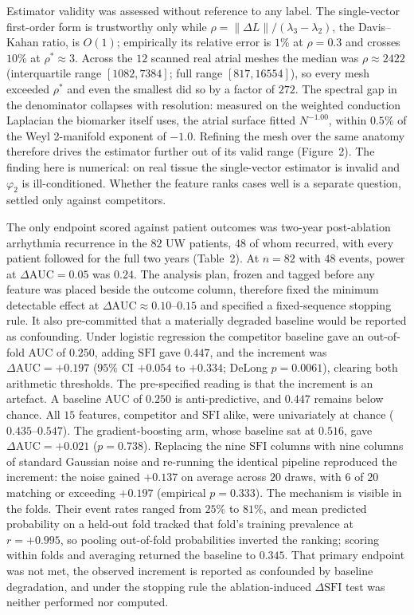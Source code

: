 \documentclass[11pt]{article}
\newcommand{\lam}{\lambda}
\newcommand{\phii}{\varphi}
\newcommand{\rhoval}{\rho}
\newcommand{\SFI}{\ensuremath{\mathrm{SFI}}}
\newcommand{\dAUC}{\ensuremath{\Delta\mathrm{AUC}}}
\begin{document}
Estimator validity was assessed without reference to any label. The
single-vector first-order form is trustworthy only while
$\rhoval=\lVert\Delta L\rVert/(\lam_3-\lam_2)$, the Davis--Kahan ratio\cite{daviskahan1970}, is $O(1)$; empirically its
relative error is $1\%$ at $\rhoval=0.3$ and crosses $10\%$ at
$\rhoval^\ast\approx3$. Across the $12$ scanned real atrial meshes the median was
$\rhoval\approx2422$ (interquartile range $[1082,7384]$; full range
$[817,16554]$), so every mesh exceeded $\rhoval^\ast$ and even the smallest did so
by a factor of $272$. The spectral gap in the denominator collapses with
resolution: measured on the weighted conduction Laplacian the biomarker itself
uses, the atrial surface fitted $N^{-1.00}$, within $0.5\%$ of the Weyl
2-manifold exponent\cite{weyl1912} of $-1.0$. Refining the mesh over the same anatomy therefore
drives the estimator further out of its valid range (Figure~2). The finding here
is numerical: on real tissue the single-vector estimator is invalid and
$\phii_2$ is ill-conditioned. Whether the feature ranks cases well is a separate
question, settled only against competitors.

The only endpoint scored against patient outcomes was two-year post-ablation
arrhythmia recurrence in the $82$ UW patients, $48$ of whom recurred, with every
patient followed for the full two years (Table~2). At $n=82$ with $48$ events,
power at $\dAUC=0.05$ was $0.24$. The analysis plan, frozen and tagged before any
feature was placed beside the outcome column, therefore fixed the minimum
detectable effect at $\dAUC\approx0.10$--$0.15$ and specified a fixed-sequence
stopping rule. It also pre-committed that a materially degraded baseline would be
reported as confounding. Under logistic
regression the competitor baseline gave an out-of-fold AUC of $0.250$, adding
\SFI{} gave $0.447$, and the increment was $\dAUC=+0.197$ ($95\%$ CI $+0.054$ to
$+0.334$; DeLong $p=0.0061$), clearing both arithmetic thresholds. The
pre-specified reading is that the increment is an artefact. A baseline AUC of
$0.250$ is anti-predictive, and $0.447$ remains below chance. All $15$ features,
competitor and \SFI{} alike, were univariately at chance ($0.435$--$0.547$). The
gradient-boosting arm, whose baseline sat at $0.516$, gave $\dAUC=+0.021$
($p=0.738$). Replacing the nine \SFI{} columns with nine columns of standard
Gaussian noise and re-running the identical pipeline reproduced the increment:
the noise gained $+0.137$ on
average across $20$ draws, with $6$ of $20$ matching or exceeding $+0.197$
(empirical $p=0.333$). The mechanism is visible in the folds. Their event rates
ranged from $25\%$ to $81\%$, and mean predicted probability on a held-out fold
tracked that fold's training prevalence at $r=+0.995$, so pooling out-of-fold
probabilities inverted the ranking; scoring within folds and averaging returned
the baseline to $0.345$. That primary endpoint was not met, the
observed increment is reported as confounded by baseline degradation, and under
the stopping rule the ablation-induced $\Delta$\SFI{} test was neither performed
nor computed.
\end{document}
